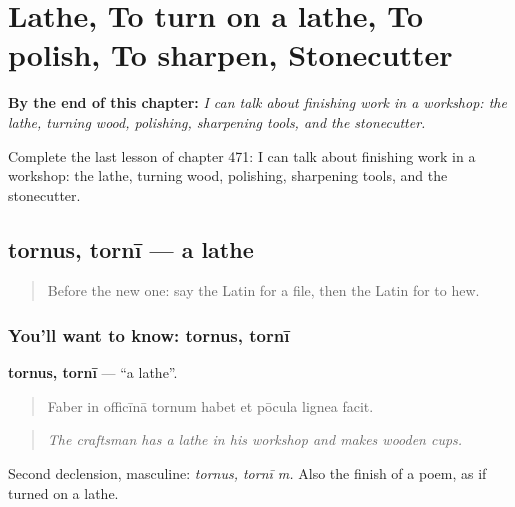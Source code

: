 
\chapter{Lathe, To turn on a lathe, To polish, To sharpen, Stonecutter}
\label{ch:la-lathe-to-turn-on-a-lathe-to-polish-to-sharpen-stonecutter}

\begin{chapteropening}
\textbf{By the end of this chapter:} \emph{I can talk about finishing work in a workshop: the lathe, turning wood, polishing, sharpening tools, and the stonecutter.}

Complete the last lesson of chapter 471: I can talk about finishing work in a workshop: the lathe, turning wood, polishing, sharpening tools, and the stonecutter.
\end{chapteropening}

\section[tornus, tornī]{tornus, tornī — a lathe}

\label{lesson:LA-C471-tornus}



\begin{quote}
Before the new one: say the Latin for a file, then the Latin for to hew.
\end{quote}

\subsection*{You'll want to know: tornus, tornī}
\textbf{tornus, tornī} — \textquotedblleft{}a lathe\textquotedblright{}.

\begin{quote}
Faber in officīnā tornum habet et pōcula lignea facit.
\end{quote}

\begin{quote}
\emph{The craftsman has a lathe in his workshop and makes wooden cups.}
\end{quote}

Second declension, masculine: \emph{tornus, tornī m.} Also the finish of a poem, as if turned on a lathe.

